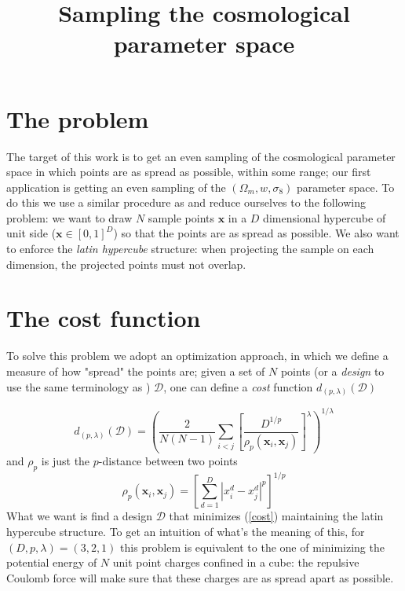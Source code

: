 \documentclass[11pt]{article}
\title{Sampling the cosmological parameter space}
\author{}
\date{}
\begin{document}
\maketitle

\section*{The problem}
The target of this work is to get an even sampling of the cosmological parameter space in which points are as spread as possible, within some range; our first application is getting an even sampling of the $(\Omega_m,w,\sigma_8)$ parameter space. To do this we use a similar procedure as \cite{coyote2} and reduce ourselves to the following problem: we want to draw $N$ sample points $\mathbf{x}$ in a $D$ dimensional hypercube of unit side ($\mathbf{x}\in[0,1]^D$) so that the points are as spread as possible. We also want to enforce the \textit{latin hypercube} structure: when projecting the sample on each dimension, the projected points must not overlap. 

\section*{The cost function}
To solve this problem we adopt an optimization approach, in which we define a measure of how "spread" the points are; given a set of $N$ points (or a \textit{design} to use the same terminology as \cite{coyote2}) $\mathcal{D}$, one can define a \textit{cost} function $d_{(p,\lambda)}(\mathcal{D})$

\begin{equation}
\label{cost}
d_{(p,\lambda)}(\mathcal{D}) = \left(\frac{2}{N(N-1)}\sum_{i<j}\left[\frac{D^{1/p}}{\rho_p(\mathbf{x}_i,\mathbf{x}_j)}\right]^\lambda\right)^{1/\lambda}
\end{equation}
%
and $\rho_p$ is just the $p$-distance between two points
\begin{equation}
\label{pdistance}
\rho_p(\mathbf{x}_i,\mathbf{x}_j)=\left[\sum_{d=1}^D\left\vert x_i^d-x_j^d\right\vert^p\right]^{1/p}
\end{equation}
%
What we want is find a design $\mathcal{D}$ that minimizes (\ref{cost}) maintaining the latin hypercube structure. To get an intuition of what's the meaning of this, for $(D,p,\lambda)=(3,2,1)$ this problem is equivalent to the one of minimizing the potential energy of $N$ unit point charges confined in a cube: the repulsive Coulomb force will make sure that these charges are as spread apart as possible. 
\end{document}
